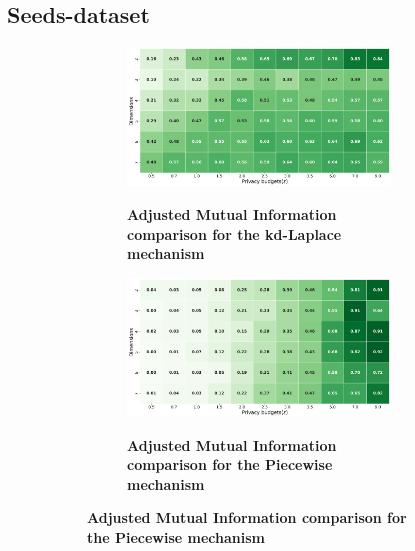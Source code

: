 \subsection{Seeds-dataset}
\begin{figure}[H]
  \centering
  \begin{subfigure}[b]{0.90\textwidth}
    \begin{subfigure}[c]{1\textwidth}
      \caption{\textbf{Adjusted Mutual Information comparison for the kd-Laplace mechanism}}
      \includegraphics[width=1\textwidth]{Results/kd-laplace/kd-Laplace/seeds-dataset/ami.png}
      \label{fig:ami_seeds-dataset_comparison_kdlaplace_2d}
    \end{subfigure}
    \vfill %
    \begin{subfigure}[c]{1\textwidth}
      \caption{\textbf{Adjusted Mutual Information comparison for the Piecewise mechanism}}
      \includegraphics[width=1\textwidth]{Results/kd-laplace/piecewise/seeds-dataset/ami.png}
      \label{fig:ami_seeds-dataset_comparison_piecewise_2d}
    \end{subfigure}
  \end{subfigure}
  \hfill %
  \begin{subfigure}[b]{0.075\textwidth}

\end{subfigure}
\end{figure}
